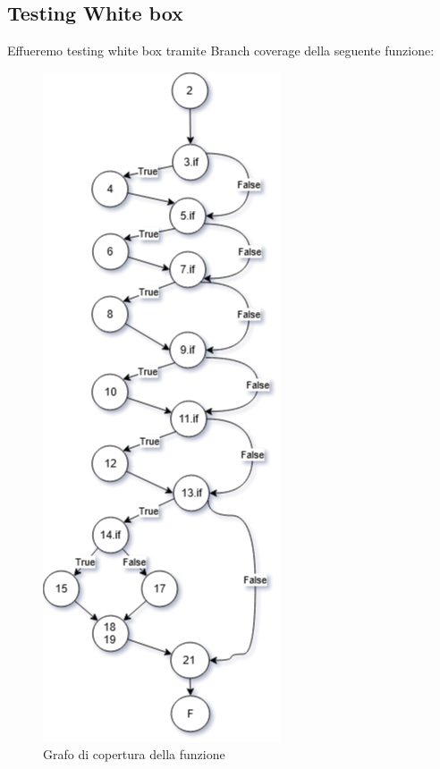 \pagebreak
\subsection{Testing White box}
Effueremo testing white box tramite Branch coverage della seguente funzione:



\begin{center}
    \begin{figure}[h]
        \centering
        \caption{Grafo di copertura della funzione}
        \includegraphics[height=\textheight]{Figures/Grafo di copertura.png}
    \end{figure}
\end{center}